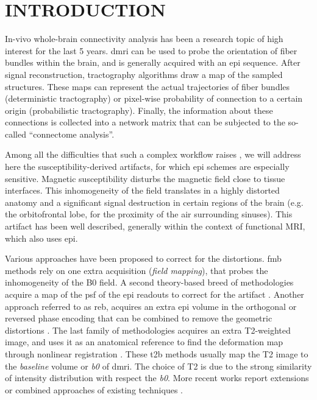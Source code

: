 \section{INTRODUCTION}
\label{sec:intro}
In-vivo whole-brain connectivity analysis has been a
research topic of high interest for the last 5 years.
\Gls*{dmri} can be used to probe the
orientation of fiber bundles within the brain,
and is generally acquired with an \gls*{epi} sequence.
After signal reconstruction,
tractography algorithms draw a map of the sampled 
structures.
These maps can represent the actual trajectories
of fiber bundles (deterministic tractography) or
pixel-wise probability of connection to a certain origin
(probabilistic tractography). Finally, the
information about these connections is collected
into a network matrix that can be subjected to
the so-called ``connectome analysis''.

Among all the difficulties that such a complex workflow
raises \cite{jones_twenty-five_2010}, we will
address here the susceptibility-derived artifacts,
for which \Gls*{epi} schemes are especially sensitive.
Magnetic susceptibility disturbs the magnetic field
close to tissue interfaces. This inhomogeneity
of the field translates in a highly distorted
anatomy and a significant signal destruction in
certain regions of the brain 
(e.g. the orbitofrontal lobe, for the proximity of the
air surrounding sinuses). This artifact has been
well described, generally within the context of
functional MRI, which also uses \gls*{epi}.

Various approaches have been proposed to correct
for the distortions. \Gls*{fmb} methods
\cite{jezzard_correction_1995} rely on one extra
acquisition (\emph{field mapping}),
that probes the inhomogeneity of the B0 field.
A second theory-based breed of methodologies acquire a 
map of the \acrlong*{psf} of the \gls*{epi} readouts to correct 
for the artifact \cite{robson_measurement_1997}.
Another approach referred to as \gls*{reb}, acquires an
extra \gls*{epi} volume in the orthogonal or reversed
phase encoding that can be combined to remove the
geometric distortions
\cite{cordes_geometric_2000,chiou_simple_2000}.
The last family of methodologies acquires an
extra T2-weighted image, and uses it as an anatomical
reference to find the deformation map through nonlinear 
registration \cite{kybic_unwarping_2000,studholme_accurate_2000}.
These \gls*{t2b} methods usually map
the T2 image to the \emph{baseline} volume or \textit{b0}
of \gls*{dmri}. The choice of T2 is due to the strong
similarity of intensity distribution with respect the \textit{b0}.
More recent works report extensions or combined
approaches of existing techniques
\cite{andersson_how_2003,zaitsev_point_2004,%
holland_efficient_2010,andersson_comprehensive_2012}.

